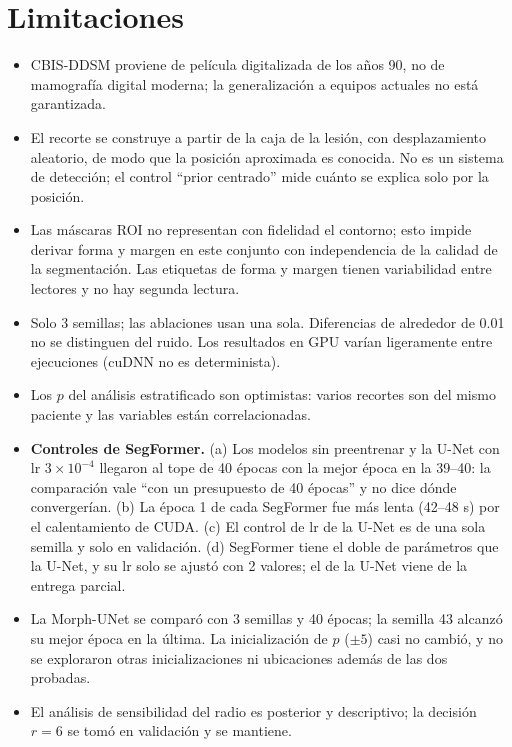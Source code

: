 \documentclass[11pt,a4paper]{article}
\begin{document}
\section{Limitaciones}
\begin{itemize}
\item CBIS-DDSM proviene de película digitalizada de los años 90, no de mamografía digital moderna; la generalización a equipos actuales no está garantizada.
\item El recorte se construye a partir de la caja de la lesión, con desplazamiento aleatorio, de modo que la posición aproximada es conocida. No es un sistema de detección; el control ``prior centrado'' mide cuánto se explica solo por la posición.
\item Las máscaras ROI no representan con fidelidad el contorno; esto impide derivar forma y margen en este conjunto con independencia de la calidad de la segmentación. Las etiquetas de forma y margen tienen variabilidad entre lectores y no hay segunda lectura.
\item Solo 3 semillas; las ablaciones usan una sola. Diferencias de alrededor de 0.01 no se distinguen del ruido. Los resultados en GPU varían ligeramente entre ejecuciones (cuDNN no es determinista).
\item Los $p$ del análisis estratificado son optimistas: varios recortes son del mismo paciente y las variables están correlacionadas.
\item \textbf{Controles de SegFormer.} (a) Los modelos sin preentrenar y la U-Net con lr $3\times10^{-4}$ llegaron al tope de 40 épocas con la mejor época en la 39--40: la comparación vale ``con un presupuesto de 40 épocas'' y no dice dónde convergerían. (b) La época 1 de cada SegFormer fue más lenta (42--48 s) por el calentamiento de CUDA. (c) El control de lr de la U-Net es de una sola semilla y solo en validación. (d) SegFormer tiene el doble de parámetros que la U-Net, y su lr solo se ajustó con 2 valores; el de la U-Net viene de la entrega parcial.
\item La Morph-UNet se comparó con 3 semillas y 40 épocas; la semilla 43 alcanzó su mejor época en la última. La inicialización de $p$ ($\pm5$) casi no cambió, y no se exploraron otras inicializaciones ni ubicaciones además de las dos probadas.
\item El análisis de sensibilidad del radio es posterior y descriptivo; la decisión $r=6$ se tomó en validación y se mantiene.
\end{itemize}

\end{document}
